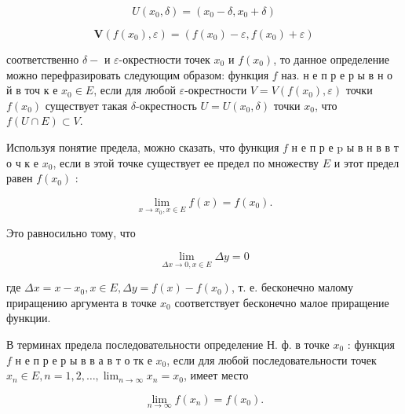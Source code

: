 \documentclass[10pt]{article}
\begin{document}
\[

U\left(x_{0}, \delta\right)=\left(x_{0}-\delta, x_{0}+\delta\right)

\]



\[

\boldsymbol{V}\left(f\left(x_{0}\right), \varepsilon\right)=\left(f\left(x_{0}\right)-\varepsilon, f\left(x_{0}\right)+\varepsilon\right)

\]



соответственно $\delta-$ и $\varepsilon$-окрестности точек $x_{0}$ и $f\left(x_{0}\right)$, то данное определение можно перефразировать следующим образом: функция $f$ наз. н е п р е р ы в н о й в точ к е $x_{0} \in E$, если для любой $\varepsilon$-окрестности $V=V\left(f\left(x_{0}\right), \varepsilon\right)$ точки $f\left(x_{0}\right)$ существует такая $\delta$-окрестность $U=U\left(x_{0}, \delta\right)$ точки $x_{0}$, что $f(U \cap E) \subset V$.



Используя понятие предела, можно сказать, что функция $f$ н е п р е p ы в н в в т о ч к е $x_{0}$, если в этой точке существует ее предел по множеству $E$ и этот предел равен $f\left(x_{0}\right)$ :



\[

\lim _{x \rightarrow x_{0}, x \in E} f(x)=f\left(x_{0}\right) .

\]



Это равносильно тому, что



\[

\lim _{\Delta x \rightarrow 0, x \in E} \Delta y=0

\]



где $\Delta x=x-x_{0}, x \in E, \Delta y=f(x)-f\left(x_{0}\right)$, т. е. бесконечно малому приращению аргумента в точке $x_{0}$ соответствует бесконечно малое приращение функции.



В терминах предела последовательности определение Н. ф. в точке $x_{0}$ : функция $f$ н е п р е р ы в в а в т о тк е $x_{0}$, если для любой последовательности точек $x_{n} \in E, n=1,2, \ldots, \lim _{n \rightarrow \infty} x_{n}=x_{0}$, имеет место



\[

\lim _{n \rightarrow \infty} f\left(x_{n}\right)=f\left(x_{0}\right) .

\]
\end{document}
